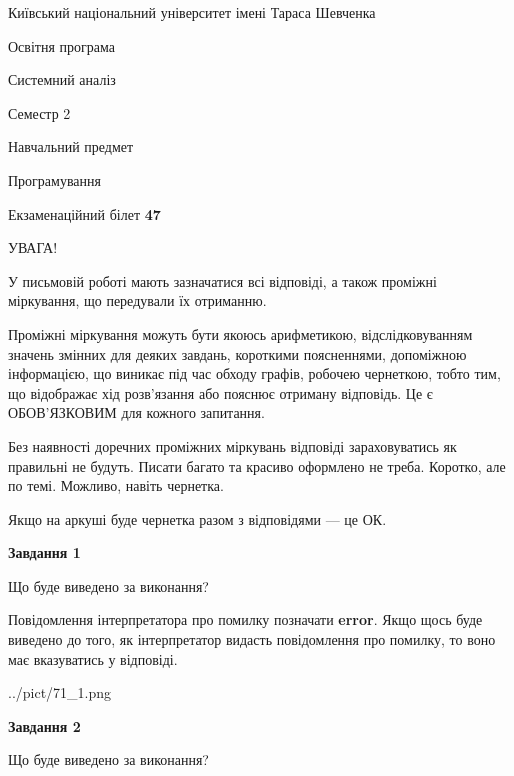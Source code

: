 \documentclass[12pt, ukrainian]{article}
\begin{document}
{{\begin {small}\par
{ \center  Київський національний університет імені Тараса Шевченка \par}
{\parbox {5 cm}{Освітня програма \hfill}{\parbox {7 cm}{Системний аналіз \hfill}}\parbox {6 cm}{\hfill Семестр 2}}\par
{\parbox {5 cm} {Навчальний предмет \hfill}\parbox {7 cm}{Програмування \hfill}\parbox {6cm}{\hfill}\par}\vspace{-7pt} \end{small}}{\center Екзаменаційний білет \No \textbf
{ 47 }\par}}
{
\begin {large}
УВАГА!

У письмовій роботі мають зазначатися всі відповіді, а також проміжні міркування, що передували їх отриманню.

Проміжні міркування можуть бути якоюсь арифметикою, відслідковуванням зна\-чень змінних для деяких завдань,
короткими поясненнями, допоміжною інформацією, що виникає під час обходу графів, робочею чернеткою,
тобто тим, що відображає хід розв’язання або пояснює отриману відповідь.
Це є ОБОВ’ЯЗКОВИМ для кожного запитання.

Без наявності доречних проміжних міркувань відповіді зараховуватись як правиль\-ні не будуть.
Писати багато та красиво оформлено не треба. Коротко, але по темі. Можли\-во, навіть чернетка.

Якщо на аркуші буде чернетка разом з відповідями --- це ОК.

\newpage

{\begin {center}\textbf{Завдання 1}\end {center}}\par
Що буде виведено за виконання?

Повідомлення інтерпретатора про помилку позначати \textbf{error}.
Якщо щось буде виведено до того, як інтерпретатор видасть повідомлення про помилку, 
то воно має вказуватись у відповіді. \par


\begin{center}
	{../pict/71_1.png}
\end{center}
\newpage

{\begin {center}\textbf{Завдання 2}\end {center}}\par
Що буде виведено за виконання?


\end{large}}
\end{document}

